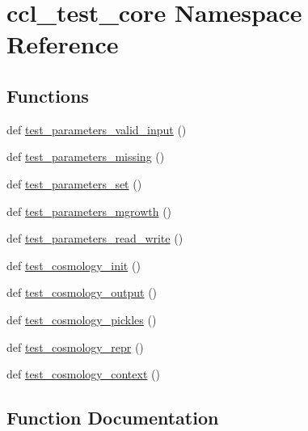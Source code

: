 \hypertarget{namespaceccl__test__core}{}\section{ccl\+\_\+test\+\_\+core Namespace Reference}
\label{namespaceccl__test__core}
\subsection*{Functions}
\begin{DoxyCompactItemize}
\item 
def \mbox{\hyperlink{namespaceccl__test__core_a5d78733a80588dd665203627d89b0b6f}{test\+\_\+parameters\+\_\+valid\+\_\+input}} ()
\item 
def \mbox{\hyperlink{namespaceccl__test__core_a0e549d6d40a6192560d27eeee5a52c6a}{test\+\_\+parameters\+\_\+missing}} ()
\item 
def \mbox{\hyperlink{namespaceccl__test__core_a6d316a5e78c5a180dfc4b6887fa0b9f8}{test\+\_\+parameters\+\_\+set}} ()
\item 
def \mbox{\hyperlink{namespaceccl__test__core_a1cf68bb2178c995528cfa1a7f1c14832}{test\+\_\+parameters\+\_\+mgrowth}} ()
\item 
def \mbox{\hyperlink{namespaceccl__test__core_a924e671fa5314cb9250c4e9205105870}{test\+\_\+parameters\+\_\+read\+\_\+write}} ()
\item 
def \mbox{\hyperlink{namespaceccl__test__core_a4d2642cc4efaf3e38a2ba27fecc98abd}{test\+\_\+cosmology\+\_\+init}} ()
\item 
def \mbox{\hyperlink{namespaceccl__test__core_a7086ffc367c4c602cd12e67b76209a44}{test\+\_\+cosmology\+\_\+output}} ()
\item 
def \mbox{\hyperlink{namespaceccl__test__core_a6eb4932e1d1d3b5ba670e92cb7380254}{test\+\_\+cosmology\+\_\+pickles}} ()
\item 
def \mbox{\hyperlink{namespaceccl__test__core_a378920c66829abd38df0532cdbc13f22}{test\+\_\+cosmology\+\_\+repr}} ()
\item 
def \mbox{\hyperlink{namespaceccl__test__core_a62090b86ba8470f93cbfb1241ce581be}{test\+\_\+cosmology\+\_\+context}} ()
\end{DoxyCompactItemize}


\subsection{Function Documentation}
\mbox{\label{namespaceccl__test__core_a62090b86ba8470f93cbfb1241ce581be}} 

